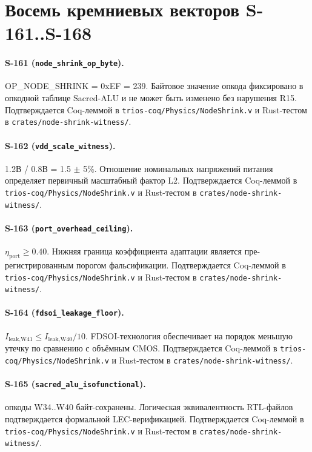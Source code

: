 \section{Восемь кремниевых векторов S-161..S-168}
\label{sec:svectors}

\paragraph{S-161 (\texttt{node\_shrink\_op\_byte}).} OP\_NODE\_SHRINK = 0xEF = 239. Байтовое значение опкода фиксировано в опкодной таблице Sacred-ALU и не может быть изменено без нарушения R15.
Подтверждается Coq-леммой в \texttt{trios-coq/Physics/NodeShrink.v}
и Rust-тестом в \texttt{crates/node-shrink-witness/}.

\paragraph{S-162 (\texttt{vdd\_scale\_witness}).} 1.2В / 0.8В = 1.5 $\pm$ 5\%. Отношение номинальных напряжений питания определяет первичный масштабный фактор L2.
Подтверждается Coq-леммой в \texttt{trios-coq/Physics/NodeShrink.v}
и Rust-тестом в \texttt{crates/node-shrink-witness/}.

\paragraph{S-163 (\texttt{port\_overhead\_ceiling}).} $\eta_{\text{port}} \geq 0.40$. Нижняя граница коэффициента адаптации является пре-регистрированным порогом фальсификации.
Подтверждается Coq-леммой в \texttt{trios-coq/Physics/NodeShrink.v}
и Rust-тестом в \texttt{crates/node-shrink-witness/}.

\paragraph{S-164 (\texttt{fdsoi\_leakage\_floor}).} $I_{\text{leak,W41}} \leq I_{\text{leak,W40}} / 10$. FDSOI-технология обеспечивает на порядок меньшую утечку по сравнению с объёмным CMOS.
Подтверждается Coq-леммой в \texttt{trios-coq/Physics/NodeShrink.v}
и Rust-тестом в \texttt{crates/node-shrink-witness/}.

\paragraph{S-165 (\texttt{sacred\_alu\_isofunctional}).} опкоды W34..W40 байт-сохранены. Логическая эквивалентность RTL-файлов подтверждается формальной LEC-верификацией.
Подтверждается Coq-леммой в \texttt{trios-coq/Physics/NodeShrink.v}
и Rust-тестом в \texttt{crates/node-shrink-witness/}.

